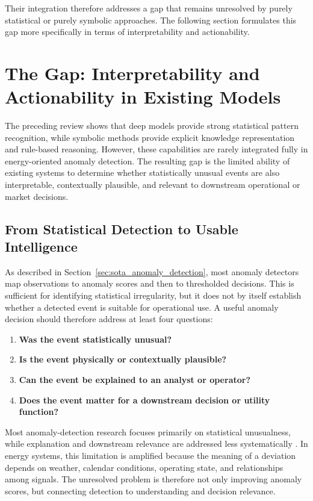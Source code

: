Their integration therefore addresses a gap that remains unresolved by purely
statistical or purely symbolic approaches. The following section formulates this
gap more specifically in terms of interpretability and actionability.

\section{The Gap: Interpretability and Actionability in Existing Models}
\label{sec:gap_analysis}

The preceding review shows that deep models provide strong statistical pattern
recognition, while symbolic methods provide explicit knowledge representation and
rule-based reasoning. However, these capabilities are rarely integrated fully in
energy-oriented anomaly detection. The resulting gap is the limited ability of
existing systems to determine whether statistically unusual events are also
interpretable, contextually plausible, and relevant to downstream operational or
market decisions.



\subsection{From Statistical Detection to Usable Intelligence}

As described in Section~\ref{sec:sota_anomaly_detection}, most anomaly detectors
map observations to anomaly scores and then to thresholded decisions. This is
sufficient for identifying statistical irregularity, but it does not by itself
establish whether a detected event is suitable for operational use. A useful
anomaly decision should therefore address at least four questions:
\begin{enumerate}
	\item \textbf{Was the event statistically unusual?}
	\item \textbf{Is the event physically or contextually plausible?}
	\item \textbf{Can the event be explained to an analyst or operator?}
	\item \textbf{Does the event matter for a downstream decision or utility function?}
\end{enumerate}

Most anomaly-detection research focuses primarily on statistical unusualness,
while explanation and downstream relevance are addressed less systematically
\cite{chandola2009anomaly,blazquez2021review}. In energy systems, this limitation
is amplified because the meaning of a deviation depends on weather, calendar
conditions, operating state, and relationships among signals. The unresolved
problem is therefore not only improving anomaly scores, but connecting detection
to understanding and decision relevance.

